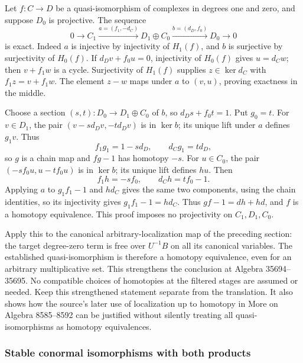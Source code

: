 Let \(f:C\to D\) be a quasi-isomorphism of complexes in degrees one and zero, and suppose \(D_0\) is projective. The sequence \[
0\to C_1\xrightarrow{a=(f_1,-d_C)}D_1\oplus C_0
\xrightarrow{b=(d_D,f_0)}D_0\to0\tag{6}
\] is exact. Indeed \(a\) is injective by injectivity of \(H_1(f)\), and \(b\) is surjective by surjectivity of \(H_0(f)\). If \(d_Dv+f_0u=0\), injectivity of \(H_0(f)\) gives \(u=d_Cw\); then \(v+f_1w\) is a cycle. Surjectivity of \(H_1(f)\) supplies \(z\in\ker d_C\) with \(f_1z=v+f_1w\). The element \(z-w\) maps under \(a\) to \((v,u)\), proving exactness in the middle.

Choose a section \((s,t):D_0\to D_1\oplus C_0\) of \(b\), so \(d_Ds+f_0t=1\). Put \(g_0=t\). For \(v\in D_1\), the pair \((v-sd_Dv,-td_Dv)\) is in \(\ker b\); its unique lift under \(a\) defines \(g_1v\). Thus \[
f_1g_1=1-sd_D,\qquad d_Cg_1=td_D,
\] so \(g\) is a chain map and \(fg-1\) has homotopy \(-s\). For \(u\in C_0\), the pair \((-sf_0u,u-tf_0u)\) is in \(\ker b\); its unique lift defines \(hu\). Then \[
f_1h=-sf_0,\qquad d_Ch=tf_0-1.
\] Applying \(a\) to \(g_1f_1-1\) and \(hd_C\) gives the same two components, using the chain identities, so its injectivity gives \(g_1f_1-1=hd_C\). Thus \(gf-1=dh+hd\), and \(f\) is a homotopy equivalence. This proof imposes no projectivity on \(C_1,D_1,C_0\).

Apply this to the canonical arbitrary-localization map of the preceding section: the target degree-zero term is free over \(U^{-1}B\) on all its canonical variables. The established quasi-isomorphism is therefore a homotopy equivalence, even for an arbitrary multiplicative set. This strengthens the conclusion at Algebra 35694--35695. No compatible choices of homotopies at the filtered stages are assumed or needed. Keep this strengthened statement separate from the translation. It also shows how the source's later use of localization up to homotopy in More on Algebra 8585--8592 can be justified without silently treating all quasi-isomorphisms as homotopy equivalences.

\subsubsection{Stable conormal isomorphisms with both products}\label{algebra-proof-044-stable-conormal-isomorphisms-with-both-products}

